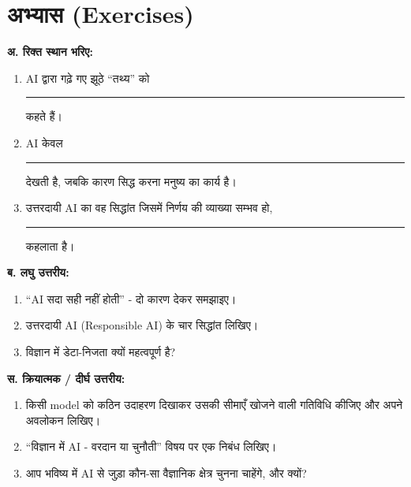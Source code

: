 \section*{अभ्यास (Exercises)}
\textbf{अ. रिक्त स्थान भरिए:}
\begin{enumerate}[leftmargin=1.6em]
  \item AI द्वारा गढ़े गए झूठे “तथ्य” को \rule{2.8cm}{0.4pt} कहते हैं।
  \item AI केवल \rule{2.8cm}{0.4pt} देखती है, जबकि कारण सिद्ध करना मनुष्य का कार्य है।
  \item उत्तरदायी AI का वह सिद्धांत जिसमें निर्णय की व्याख्या सम्भव हो,
        \rule{2.8cm}{0.4pt} कहलाता है।
\end{enumerate}

\textbf{ब. लघु उत्तरीय:}
\begin{enumerate}[leftmargin=1.6em]
  \item “AI सदा सही नहीं होती” - दो कारण देकर समझाइए।
  \item उत्तरदायी AI (Responsible AI) के चार सिद्धांत लिखिए।
  \item विज्ञान में डेटा-निजता क्यों महत्वपूर्ण है?
\end{enumerate}

\textbf{स. क्रियात्मक / दीर्घ उत्तरीय:}
\begin{enumerate}[leftmargin=1.6em]
  \item किसी model को कठिन उदाहरण दिखाकर उसकी सीमाएँ खोजने वाली गतिविधि कीजिए और
        अपने अवलोकन लिखिए।
  \item “विज्ञान में AI - वरदान या चुनौती” विषय पर एक निबंध लिखिए।
  \item आप भविष्य में AI से जुड़ा कौन-सा वैज्ञानिक क्षेत्र चुनना चाहेंगे, और क्यों?
\end{enumerate}


